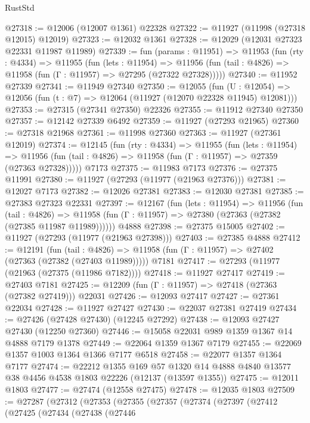 \begin{lexlean}{RustStd}
\begin{coremodule}
@27318 := @12006 (@12007 @1361) @22328
@27322 := @11927 (@11998 (@27318 @12015) @12019)
@27323 := @12032 @1361
@27328 := @12029 (@12031 @27323 @22331 @11987 @11989)
@27339 := fun (params : @11951) =>
  @11953
    (fun (rty : @4334) =>
    @11955
      (fun (lets : @11954) =>
      @11956 (fun (tail : @4826) => @11958 (fun (Γ : @11957) => @27295 (@27322 @27328)))))
@27340 := @11952 @27339
@27341 := @11949 @27340
@27350 := @12055
    (fun (U : @12054) => @12056 (fun (t : @7) => @12064 (@11927 (@12070 @22328 @11945) @12081)))
@27353 := @27315 (@27341 @27350) @22326
@27355 := @11912 @27340 @27350
@27357 := @12142 @27339 @6492
@27359 := @11927 (@27293 @21965)
@27360 := @27318 @21968
@27361 := @11998 @27360
@27363 := @11927 (@27361 @12019)
@27374 := @12145
    (fun (rty : @4334) =>
    @11955
      (fun (lets : @11954) =>
      @11956 (fun (tail : @4826) => @11958 (fun (Γ : @11957) => @27359 (@27363 @27328)))))
    @7173
@27375 := @11983 @7173
@27376 := @27375 @11991
@27380 := @11927 (@27293 (@11977 (@21963 @27376)))
@27381 := @12027 @7173
@27382 := @12026 @27381
@27383 := @12030 @27381
@27385 := @27383 @27323 @22331
@27397 := @12167
    (fun (lets : @11954) =>
    @11956
      (fun (tail : @4826) =>
      @11958 (fun (Γ : @11957) => @27380 (@27363 (@27382 (@27385 @11987 @11989))))))
    @4888
@27398 := @27375 @15005
@27402 := @11927 (@27293 (@11977 (@21963 @27398)))
@27403 := @27385 @4888
@27412 := @12191
    (fun (tail : @4826) => @11958 (fun (Γ : @11957) => @27402 (@27363 (@27382 (@27403 @11989)))))
    @7181
@27417 := @27293 (@11977 (@21963 (@27375 (@11986 @7182))))
@27418 := @11927 @27417
@27419 := @27403 @7181
@27425 := @12209 (fun (Γ : @11957) => @27418 (@27363 (@27382 @27419))) @22031
@27426 := @12093 @27417
@27427 := @27361 @22034
@27428 := @11927 @27427
@27430 := @22037 @27381 @27419
@27434 := @27426 (@27428 @27430) (@12245 @27292)
@27438 := @12093 @27427 @27430 (@12250 @27360)
@27446 := @15058 @22031 @989 @1359 @1367 @14 @4888 @7179 @1378
@27449 := @22064 @1359 @1367 @7179
@27455 := @22069 @1357 @1003 @1364 @1366 @7177 @6518
@27458 := @22077 @1357 @1364 @7177
@27474 := @22212
    @1355
    @169
    @57
    @1320
    @14
    @4888
    @4840
    @13577
    @38
    @4456
    @4538
    @1803
    @22226
    (@12137 (@13597 @1355))
@27475 := @12011 @1803
@27477 := @27474 (@12558 @27475)
@27478 := @12035 @1803
@27509 := @27287
    (@27312
      (@27353
        (@27355
          (@27357
            (@27374
              (@27397
                (@27412
                  (@27425
                    (@27434
                      (@27438
                        (@27446

\end{coremodule}
\end{lexlean}
